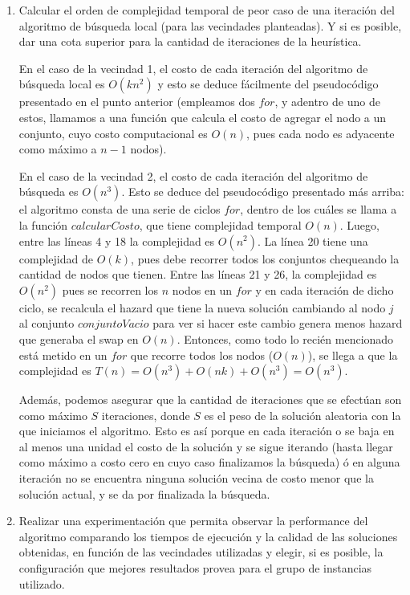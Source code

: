 \documentclass[11pt, a4paper, twoside]{article}
\begin{document}
\begin{enumerate}
		\item Calcular el orden de complejidad temporal de peor caso de una iteración del algoritmo de búsqueda local
			  (para las vecindades planteadas). Y si es posible, dar una cota superior para la cantidad de iteraciones
			  de la heurística. 
			  
			  En el caso de la vecindad 1, el costo de cada iteración del algoritmo de búsqueda local es $O(kn^2)$ y esto
			  se deduce fácilmente del pseudocódigo presentado en el punto anterior (empleamos dos $for$, y adentro de uno
			  de estos, llamamos a una función que calcula el costo de agregar el nodo a un conjunto, cuyo costo computacional
			  es $O(n)$, pues cada nodo es adyacente como máximo a $n-1$ nodos).
			  
			  En el caso de la vecindad 2, el costo de cada iteración del algoritmo de búsqueda es $ O(n^3) $. Esto se deduce
			  del pseudocódigo presentado más arriba: el algoritmo consta de una serie de ciclos $for$, dentro de los
			  cuáles se llama a la función $calcularCosto$, que tiene complejidad temporal $O(n)$. 
			  Luego, entre las líneas 4 y 18 la complejidad es $O(n^2)$. La línea 20 tiene una complejidad de $O(k)$, pues
			  debe recorrer todos los conjuntos chequeando la cantidad de nodos que tienen. Entre las líneas 21 y 26, la 
			  complejidad es $O(n^2)$ pues se recorren los $n$ nodos en un $for$ y en cada iteración de dicho ciclo, se 
			  recalcula el hazard que tiene la nueva solución cambiando al nodo $j$ al conjunto $conjuntoVacio$ para ver si
			  hacer este cambio genera menos hazard que generaba el swap en $O(n)$. 
			  Entonces, como todo lo recién mencionado está metido en un $for$ que recorre todos los nodos ($O(n)$), 
			  se llega a que la complejidad es $T(n) = O(n^3) + O(nk) + O(n^3) = O(n^3) $.
			  
			  Además, podemos asegurar que la cantidad de iteraciones que se efectúan son como máximo $S$ iteraciones, 
			  donde $S$ es el peso de la solución aleatoria con la que iniciamos el algoritmo. Esto es así porque en cada
			  iteración o se baja en al menos una unidad el costo de la solución y se sigue iterando (hasta llegar como 
			  máximo a costo cero en cuyo caso finalizamos la búsqueda) ó en alguna iteración no se encuentra ninguna 
			  solución vecina de costo menor que la solución actual, y se da por finalizada la búsqueda.
			  
	    \item Realizar una experimentación que permita observar la performance del algoritmo comparando los tiempos
			  de ejecución y la calidad de las soluciones obtenidas, en función de las vecindades utilizadas y elegir,
			  si es posible, la configuración que mejores resultados provea para el grupo de instancias utilizado.
    \end{enumerate}
\end{document}
